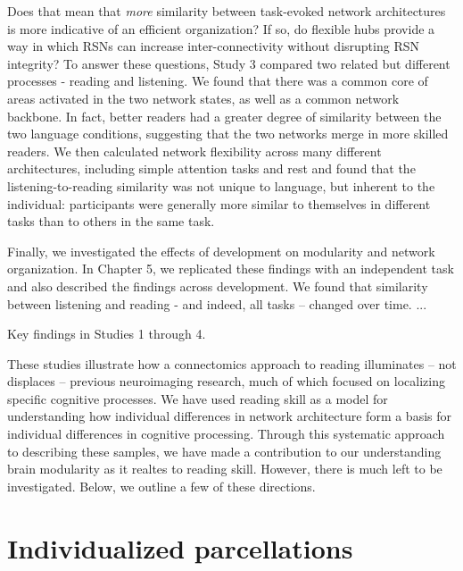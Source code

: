 Does that mean that \textit{more} similarity between task-evoked network architectures is more indicative of an efficient organization? If so, do flexible hubs provide a way in which RSNs can increase inter-connectivity without disrupting RSN integrity?  To answer these questions, Study 3 compared two related but different processes - reading and listening. We found that there was a common core of areas activated in the two network states, as well as a common network backbone. In fact, better readers had a greater degree of similarity between the two language conditions, suggesting that the two networks merge in more skilled readers. We then calculated network flexibility across many different architectures, including simple attention tasks and rest and found that the listening-to-reading similarity was not unique to language, but inherent to the individual: participants were generally more similar to themselves in different tasks than to others in the same task.

Finally, we investigated the effects of development on modularity and network organization. In Chapter 5, we replicated these findings with an independent task and also described the findings across development. We found that similarity between listening and reading - and indeed, all tasks -- changed over time. ...

\begin{table}[t]
	\renewcommand{\tabcolsep}{0.2cm}
	\centering
	
	\caption[Key findings in Studies 1 through 4.]{Key findings in Studies 1 through 4.}
	\label{table:ch6-key-findings}
\end{table}

These studies illustrate how a connectomics approach to reading illuminates -- not displaces -- previous neuroimaging research, much of which focused on localizing specific cognitive processes. We have used reading skill as a model for understanding how individual differences in network architecture form a basis for individual differences in cognitive processing. Through this systematic approach to describing these samples, we have made a contribution to our understanding brain modularity as it realtes to reading skill. However, there is much left to be investigated. Below, we outline a few of these directions.

\section{Individualized parcellations}

